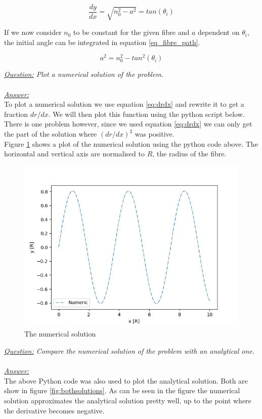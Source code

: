 \documentclass{article}
\begin{document}
\begin{equation*}
	\frac{dy}{dx} =  \sqrt{n_0^2-a^2} = tan (\theta _i)
\end{equation*}

If we now consider $n_0$ to be constant for the given fibre and $a$ dependent on $\theta _i$, the initial angle can be integrated in equation \ref{eq_fibre_path}.

\begin{equation}
	a ^2 = n_0 ^2 - tan ^2 (\theta _i)
\end{equation}

\textit{\underline{Question:} Plot a numerical solution of the problem.}\\
\\
\textit{\underline{Answer:}} \\
To plot a numerical solution we use equation \ref{eq:drdx} and rewrite it to get a fraction $dr/dx$. We will then plot this function using the python script below. There is one problem however, since we used equation  \ref{eq:drdx} we can only get the part of the solution where $(dr/dx)^2$ was positive.\\



Figure \ref{fig:numersolut} shows a plot of the numerical solution using the python code above. The horizontal and vertical axis are normalised to $R$, the radius of the fibre.\\

\begin{figure}[h!]
	\centering
	\includegraphics[width=0.55\linewidth,keepaspectratio]{afbeeldingen/numerical_solution.png}
	\caption{The numerical solution}
	\label{fig:numersolut}
\end{figure}
\textit{\underline{Question:} Compare the numerical solution of the problem with an analytical one.}\\
\\
\textit{\underline{Answer:}} \\
The above Python code was also used to plot the analytical solution. Both are show in figure \ref{fig:bothsolutions}. As can be seen in the figure the numerical solution approximates the analytical solution pretty well, up to the point where the derivative becomes negative.\\
\end{document}
